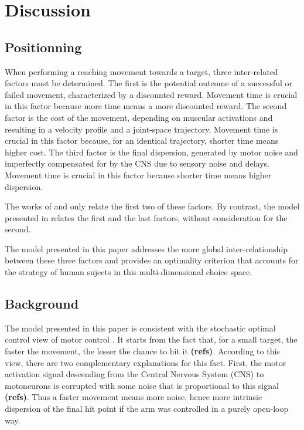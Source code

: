 \documentclass[10pt]{article}
\begin{document}

\section{Discussion}
\label{sec:discu}


\subsection{Positionning}

When performing a reaching movement towards a target, three inter-related factors must be determined. The first is the potential outcome of a successful or failed movement, characterized by a discounted reward. Movement time is crucial in this factor because more time means a more discounted reward.
The second factor is the cost of the movement, depending on muscular activations and resulting in a velocity profile and a joint-space trajectory. Movement time is crucial in this factor because, for an identical trajectory, shorter time means higher cost. The third factor is the final dispersion, generated by motor noise and imperfectly compensated for by the CNS due to sensory noise and delays. Movement time is crucial in this factor because shorter time means higher dispersion.

The works of \cite{rigoux12} and \cite{shadmehr10} only relate the first two of these factors. By contrast, the model presented in \cite{Dean2007} relates the first and the last factors, without consideration for the second. 

The model presented in this paper addresses the more global inter-relationship between these three factors and provides an optimality criterion that accounts for the strategy of human sujects in this multi-dimensional choice space.

\subsection{Background}

The model presented in this paper is consistent with the stochastic optimal control view of motor control \cite{harris98_N,todorov02_NN,todorov04_NN,todorov05_NC,li2006}. It starts from the fact that, for a small target, the faster the movement, the lesser the chance to hit it {\bf (refs)}.
According to this view, there are two complementary explanations for this fact. First, the motor activation signal descending from the Central Nervous System (CNS) to motoneurons is corrupted with some noise that is proportional to this signal {\bf (refs)}.
Thus a faster movement means more noise, hence more intrinsic dispersion of the final hit point if the arm was controlled in a purely open-loop way.
\end{document}
